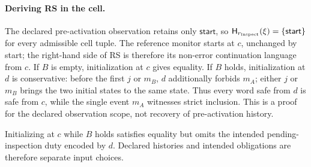 \paragraph{Deriving RS in the cell.}\label{ta:cell-residual}
The declared pre-activation observation retains only $\mathsf{start}$, so $\mathsf H_{r_{\rm inspect}}(\xi)=\{\mathsf{start}\}$ for every admissible cell tuple. The reference monitor starts at $c$, unchanged by start; the right-hand side of RS is therefore its non-error continuation language from $c$. If $B$ is empty, initialization at $c$ gives equality. If $B$ holds, initialization at $d$ is conservative: before the first $j$ or $m_B$, $d$ additionally forbids $m_A$; either $j$ or $m_B$ brings the two initial states to the same state. Thus every word safe from $d$ is safe from $c$, while the single event $m_A$ witnesses strict inclusion. This is a proof for the declared observation scope, not recovery of pre-activation history.

Initializing at $c$ while $B$ holds satisfies equality but omits the intended pending-inspection duty encoded by $d$. Declared histories and intended obligations are therefore separate input choices.


